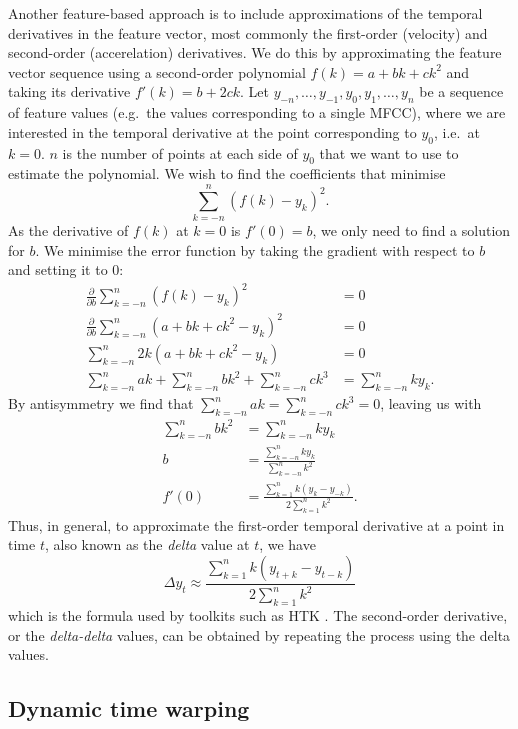 Another feature-based approach is to include approximations of the temporal derivatives in the feature vector, most commonly the first-order (velocity) and second-order (accerelation) derivatives.
We do this by approximating the feature vector sequence using a second-order polynomial $f(k)=a + bk + ck^2$ and taking its derivative $f'(k)=b + 2ck$.
Let $y_{-n}, \dots, y_{-1}, y_0, y_1, \dots, y_n$ be a sequence of feature values (e.g.\ the values corresponding to a single MFCC), where we are interested in the temporal derivative at the point corresponding to $y_0$, i.e.\ at $k=0$.
$n$ is the number of points at each side of $y_0$ that we want to use to estimate the polynomial.
We wish to find the coefficients that minimise
\[
\sum_{k=-n}^n (f(k) - y_k)^2.
\]
As the derivative of $f(k)$ at $k=0$ is $f'(0) = b$, we only need to find a solution for $b$.
We minimise the error function by taking the gradient with respect to $b$ and setting it to $0$:
\begin{align*}
  \frac{\partial}{\partial b} \sum_{k=-n}^n (f(k) - y_k)^2 &= 0 \\
  \frac{\partial}{\partial b} \sum_{k=-n}^n (a + bk + ck^2 - y_k)^2 &= 0 \\
  \sum_{k=-n}^n 2k(a + bk + ck^2 - y_k) &= 0 \\
  \sum_{k=-n}^n ak + \sum_{k=-n}^n bk^2 + \sum_{k=-n}^n ck^3 &= \sum_{k=-n}^n ky_k.
\end{align*}
By antisymmetry we find that $\sum_{k=-n}^n ak = \sum_{k=-n}^n ck^3 = 0$, leaving us with
\begin{align*}
  \sum_{k=-n}^n bk^2 &= \sum_{k=-n}^n ky_k \\
  b &= \frac{\sum_{k=-n}^n ky_k}{\sum_{k=-n}^n k^2} \\
  f'(0) &= \frac{\sum_{k=1}^n k(y_k - y_{-k})}{2\sum_{k=1}^n k^2}.
\end{align*}
Thus, in general, to approximate the first-order temporal derivative at a point in time $t$, also known as the \emph{delta} value at $t$, we have
\[
\Delta y_t \approx \frac{\sum_{k=1}^n k(y_{t+k} - y_{t-k})}{2 \sum_{k=1}^n k^2}
\]
which is the formula used by toolkits such as HTK \parencite{young2005htk}.
The second-order derivative, or the \emph{delta-delta} values, can be obtained by repeating the process using the delta values.

\subsection{Dynamic time warping}

